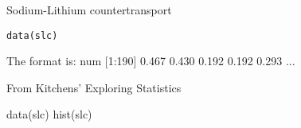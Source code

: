 \begin{Description}\relax
Sodium-Lithium countertransport
\end{Description}
\begin{Usage}
\begin{verbatim}data(slc)\end{verbatim}
\end{Usage}
\begin{Format}\relax
The format is:
num [1:190] 0.467 0.430 0.192 0.192 0.293 ...
\end{Format}
\begin{Source}\relax
From Kitchens' Exploring Statistics
\end{Source}
\begin{Examples}
\begin{ExampleCode}
data(slc)
hist(slc)
\end{ExampleCode}
\end{Examples}

